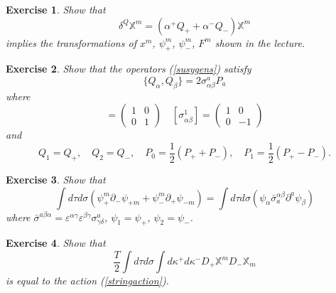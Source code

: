 \documentclass[a4paper,12pt]{article}
\newtheorem{exe}{Exercise}
\numberwithin{equation}{section}
\numberwithin{exe}{section}
\newcommand{\X}{{\mathbb X}}
\newcommand{\p}{{\partial}}
\renewcommand{\a}{{\alpha}}
\renewcommand{\b}{{\beta}}
\newcommand{\g}{{\gamma}}
\renewcommand{\d}{{\delta}}
\newcommand{\ve}{{\varepsilon}}
\renewcommand{\k}{{\kappa}}
\newcommand{\s}{{\sigma}}
\renewcommand{\sb}{{\bar\sigma}}
\begin{document}
	\begin{exe}
	Show that
		\begin{equation}
		\d^Q\X^m = (\a^+ Q_+ + \a^- Q_-)\X^m
		\end{equation}
	implies the transformations of $x^m$, $\psi^m_+$, $\psi^m_-$, $F^m$ shown in the lecture.
	\end{exe}

	\begin{exe}
	Show that the operators (\ref{susygens}) satisfy
		\begin{equation}
		\{Q_\a, Q_\b\} = 2 \s^a_{\a\b} P_a
		\end{equation}
	where
		\begin{equation}
		[\s^0_{\a\b}] = \left(
			\begin{array}{cc}
			1 & 0 \\
			0 & 1
			\end{array}
		\right)\quad [\s^1_{\a\b}] = \left(
			\begin{array}{cc}
			1 & 0 \\
			0 & -1
			\end{array}
		\right)
		\end{equation}
	and
		\begin{equation}
		Q_1 = Q_+,\quad Q_2 = Q_-,\quad P_0 = \frac12 (P_+ + P_-),\quad P_1 = \frac12 (P_+ - P_-).
		\end{equation}
	\end{exe}

	\begin{exe}
	Show that
		\begin{equation}
		\int d\tau d\s (\psi^m_+ \p_-\psi_{+m} + \psi^m_- \p_+ \psi_{-m}) = \int d\tau d\s (\psi_\a \sb^{\a\b}_a \p^a \psi_\b)
		\end{equation}
	where $\sb^{a\b\a} = \ve^{\a\g}\ve^{\b\g} \s^a_{\g\d}$, $\psi_1 = \psi_+$, $\psi_2 = \psi_-$.
	\end{exe}

	\begin{exe}
	Show that
		\begin{equation}
		\frac{T}{2}\int d\tau d\s \int d\k^+ d\k^- D_+ \X^m D_- \X_m
		\end{equation}
	is equal to the action (\ref{stringaction}).
	\end{exe}


\newpage
\end{document}
